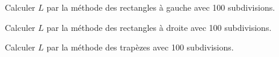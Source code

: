 \question{} Calculer $L$ par la méthode des rectangles à gauche avec 100 subdivisions.

\question{} Calculer $L$ par la méthode des rectangles à droite avec 100 subdivisions.

\question{} Calculer $L$ par la méthode des trapèzes avec 100 subdivisions.